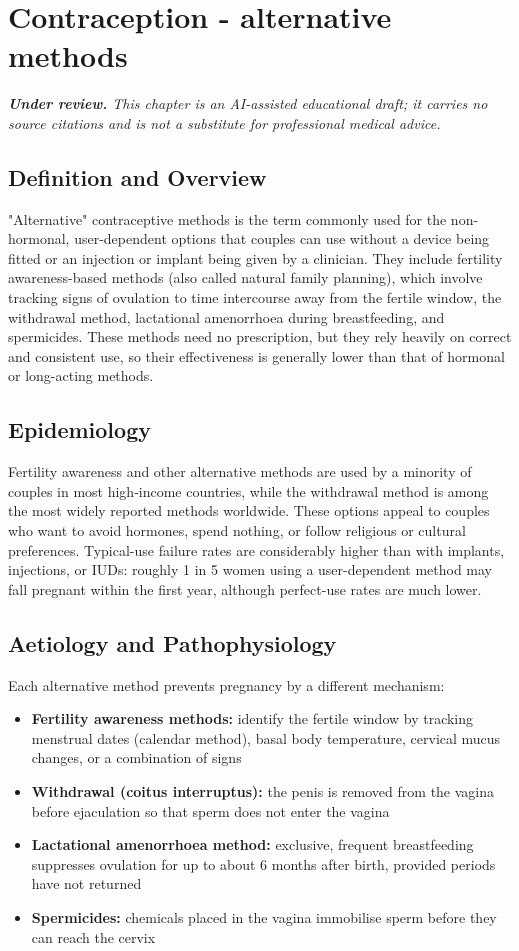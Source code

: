 \chapter{Contraception - alternative methods}

\medskip
\noindent\textit{\textbf{Under review.} This chapter is an AI-assisted educational draft; it carries no source citations and is not a substitute for professional medical advice.}

\section*{Definition and Overview}
"Alternative" contraceptive methods is the term commonly used for the non-hormonal, user-dependent options that couples can use without a device being fitted or an injection or implant being given by a clinician. They include fertility awareness-based methods (also called natural family planning), which involve tracking signs of ovulation to time intercourse away from the fertile window, the withdrawal method, lactational amenorrhoea during breastfeeding, and spermicides. These methods need no prescription, but they rely heavily on correct and consistent use, so their effectiveness is generally lower than that of hormonal or long-acting methods.

\section*{Epidemiology}
Fertility awareness and other alternative methods are used by a minority of couples in most high-income countries, while the withdrawal method is among the most widely reported methods worldwide. These options appeal to couples who want to avoid hormones, spend nothing, or follow religious or cultural preferences. Typical-use failure rates are considerably higher than with implants, injections, or IUDs: roughly 1 in 5 women using a user-dependent method may fall pregnant within the first year, although perfect-use rates are much lower.

\section*{Aetiology and Pathophysiology}
Each alternative method prevents pregnancy by a different mechanism:
\begin{itemize}
    \item \textbf{Fertility awareness methods:} identify the fertile window by tracking menstrual dates (calendar method), basal body temperature, cervical mucus changes, or a combination of signs
    \item \textbf{Withdrawal (coitus interruptus):} the penis is removed from the vagina before ejaculation so that sperm does not enter the vagina
    \item \textbf{Lactational amenorrhoea method:} exclusive, frequent breastfeeding suppresses ovulation for up to about 6 months after birth, provided periods have not returned
    \item \textbf{Spermicides:} chemicals placed in the vagina immobilise sperm before they can reach the cervix
\end{itemize}

